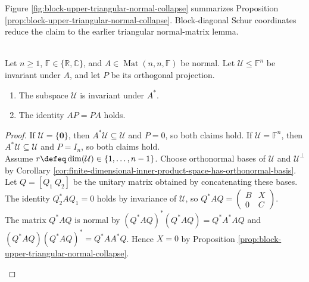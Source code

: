 Figure \ref{fig:block-upper-triangular-normal-collapse} summarizes Proposition \ref{prop:block-upper-triangular-normal-collapse}. Block-diagonal Schur coordinates reduce the claim to the earlier triangular normal-matrix lemma.

\begin{illustrationfigure}[H]
  \centering
  
  \caption{Normality removes the upper-right block in a block upper-triangular matrix.}
  \label{fig:block-upper-triangular-normal-collapse}
\end{illustrationfigure}

\begin{theorem} \label{thm:normal-invariant-subspaces-reduce} \\
Let $n\geq1$, $\mathbb{F}\in\{\mathbb{R},\mathbb{C}\}$, and $A\in\operatorname{Mat}(n,n,\mathbb{F})$ be normal. Let $\mathcal{U}\leq\mathbb{F}^n$ be invariant under $A$, and let $P$ be its orthogonal projection.
\begin{enumerate}[label=(\roman*)]
\setlength{\itemsep}{0pt}
\item The subspace $\mathcal{U}$ is invariant under $A^*$.
\item The identity $AP=PA$ holds.
\end{enumerate}
\begin{proof}
If $\mathcal{U}=\{\mathbf{0}\}$, then $A^*\mathcal{U}\subseteq\mathcal{U}$ and $P=0$, so both claims hold. If $\mathcal{U}=\mathbb{F}^n$, then $A^*\mathcal{U}\subseteq\mathcal{U}$ and $P=I_n$, so both claims hold.\\
Assume $r\defeq\dim(\mathcal{U})\in\{1,\ldots,n-1\}$. Choose orthonormal bases of $\mathcal{U}$ and $\mathcal{U}^{\perp}$ by Corollary \ref{cor:finite-dimensional-inner-product-space-has-orthonormal-basis}.\\
Let $Q=[Q_1\ Q_2]$ be the unitary matrix obtained by concatenating these bases.\\
The identity $Q_2^*AQ_1=0$ holds by invariance of $\mathcal{U}$, so $Q^*AQ=\left(\begin{smallmatrix}B&X\\0&C\end{smallmatrix}\right)$.\\
The matrix $Q^*AQ$ is normal by $(Q^*AQ)^*(Q^*AQ)=Q^*A^*AQ$ and $(Q^*AQ)(Q^*AQ)^*=Q^*AA^*Q$. Hence $X=0$ by Proposition \ref{prop:block-upper-triangular-normal-collapse}.
\begin{enumerate}[label=(\roman*)]

\end{enumerate}
\end{proof}
\end{theorem}
